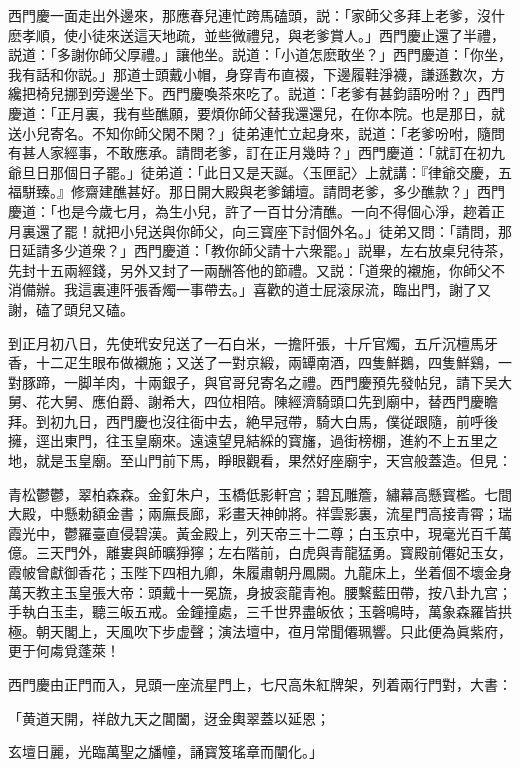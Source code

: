 西門慶一面走出外邊來，那應春兒連忙跨馬磕頭，説：「家師父多拜上老爹，沒什麽孝順，使小徒來送這天地疏，並些微禮兒，與老爹賞人。」西門慶止還了半禮，説道：「多謝你師父厚禮。」讓他坐。説道：「小道怎麽敢坐？」西門慶道：「你坐，我有話和你説。」那道士頭戴小帽，身穿青布直裰，下邊履鞋淨襪，謙遜數次，方纔把椅兒挪到旁邊坐下。西門慶喚茶來吃了。説道：「老爹有甚鈞語吩咐？」西門慶道：「正月裏，我有些醮願，要煩你師父替我還還兒，在你本院。也是那日，就送小兒寄名。不知你師父閑不閑？」徒弟連忙立起身來，説道：「老爹吩咐，隨問有甚人家經事，不敢應承。請問老爹，訂在正月幾時？」西門慶道：「就訂在初九爺旦日那個日子罷。」徒弟道：「此日又是天誕。〈玉匣記〉上就講：『律爺交慶，五福駢臻。』修齋建醮甚好。那日開大殿與老爹鋪壇。請問老爹，多少醮款？」西門慶道：「也是今歲七月，為生小兒，許了一百廿分清醮。一向不得個心淨，趂着正月裏還了罷！就把小兒送與你師父，向三寳座下討個外名。」徒弟又問：「請問，那日延請多少道衆？」西門慶道：「教你師父請十六衆罷。」説畢，左右放桌兒待茶，先封十五兩經錢，另外又封了一兩酬答他的節禮。又説：「道衆的襯施，你師父不消備辦。我這裏連阡張香燭一事帶去。」喜歡的道士屁滚尿流，臨出門，謝了又謝，磕了頭兒又磕。

到正月初八日，先使玳安兒送了一石白米，一擔阡張，十斤官燭，五斤沉檀馬牙香，十二疋生眼布做襯施；又送了一對京緞，兩罈南酒，四隻鮮鵝，四隻鮮鷄，一對豚蹄，一脚羊肉，十兩銀子，與官哥兒寄名之禮。西門慶預先發帖兒，請下吴大舅、花大舅、應伯爵、謝希大，四位相陪。陳經濟騎頭口先到廟中，替西門慶瞻拜。到初九日，西門慶也沒往衙中去，絶早冠帶，騎大白馬，僕従跟隨，前呼後擁，逕出東門，往玉皇廟來。遠遠望見結綵的寳旛，過街榜棚，進約不上五里之地，就是玉皇廟。至山門前下馬，睜眼觀看，果然好座廟宇，天宫般蓋造。但見：

青松鬱鬱，翠柏森森。金釘朱户，玉橋低影軒宫；碧瓦雕簷，繡幕高懸寳檻。七間大殿，中懸勅額金書；兩廡長廊，彩畫天神帥將。祥雲影裏，流星門高接青霄；瑞霞光中，鬱羅臺直侵碧漢。黃金殿上，列天帝三十二尊；白玉京中，現毫光百千萬億。三天門外，離婁與師曠猙獰；左右階前，白虎與青龍猛勇。寳殿前僊妃玉女，霞帔曾獻御香花；玉陛下四相九卿，朱履肅朝丹鳳闕。九龍床上，坐着個不壞金身萬天教主玉皇張大帝：頭戴十一冕旒，身披衮龍青袍。腰繫藍田帶，按八卦九宫；手執白玉圭，聽三皈五戒。金鐘撞處，三千世界盡皈依；玉磬鳴時，萬象森羅皆拱極。朝天閣上，天風吹下步虚聲；演法壇中，亱月常聞僊珮響。只此便為眞紫府，更于何䖏覓蓬萊！

西門慶由正門而入，見頭一座流星門上，七尺高朱紅牌架，列着兩行門對，大書：

「黄道天開，祥啟九天之閶闔，迓金輿翠蓋以延恩；

玄壇日麗，光臨萬聖之旙幢，誦寳笈瑤章而闡化。」

